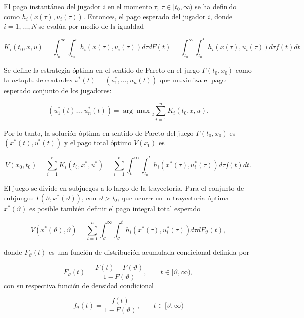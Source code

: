 \documentclass[11pt, oneside]{article}
\begin{document}
El pago instantáneo del jugador $i$ en el momento $\tau$, $\tau \in [t_0,\infty)$ se ha definido como $h_i(x(\tau), u_i(\tau))$. Entonces, el pago esperado del jugador $i$, donde $i = 1,\dots,N$ se evalúa por medio de la igualdad

\begin{equation}
	K_i(t_0, x, u) = \int_{t_0}^\infty\int_{t_0}^t h_i(x(\tau), u_i(\tau)) d\tau dF(t) = \int_{t_0}^\infty\int_{t_0}^t h_i(x(\tau), u_i(\tau)) d\tau f(t) dt
\end{equation}

Se define la estrategia óptima en el sentido de Pareto en el juego $\Gamma(t_0,x_0)$ como la $n$-tupla de controles $u^*(t) = (u_1^*, \dots, u_n(t))$ que maximiza el pago esperado conjunto de los jugadores:

\begin{equation}
	(u_1^*(t)\dots,u_n^*(t)) = {\arg\max}_u \sum_{i=1}^nK_i(t_0,x,u).
\end{equation}

Por lo tanto, la solución óptima en sentido de Pareto del juego $\Gamma(t_0,x_0)$ es $(x^*(t), u^*(t))$ y el pago total óptimo $V(x_0)$ es

\begin{equation}
	V(x_0, t_0) = \sum_{i=1}^n K_i(t_0,x^*,u^*) = \sum_{i=1}^n \int_{t_0}^\infty \int_{t_0}^t h_i(x^*(\tau), u_i^*(\tau))d\tau f(t)dt.
\end{equation}

El juego se divide en subjuegos a lo largo de la trayectoria. Para el conjunto de subjuegos $\Gamma(\vartheta, x^*(\vartheta))$, con $\vartheta > t_0$, que ocurre en la trayectoria óptima $x^*(\vartheta)$ es posible también definir el pago integral total esperado 

\begin{equation}
	V(x^*(\vartheta), \vartheta) = \sum_{i=1}^n \int_{\vartheta}^\infty \int_{\vartheta}^t h_i(x^*(\tau), u_i^*(\tau))d\tau dF_\vartheta(t),
\end{equation}

donde $F_\vartheta(t)$ es una función de distribución acumulada condicional definida por

\begin{equation}
	F_\vartheta(t) = \frac{F(t) - F(\vartheta)}{1 - F(\vartheta)}, \qquad t \in [\vartheta, \infty),
\end{equation}
con su respectiva función de densidad condicional

\begin{equation}
	f_\vartheta(t) = \frac{f(t)}{1 - F(\vartheta)}, \qquad t \in [\vartheta, \infty)
\end{equation}
\end{document}

